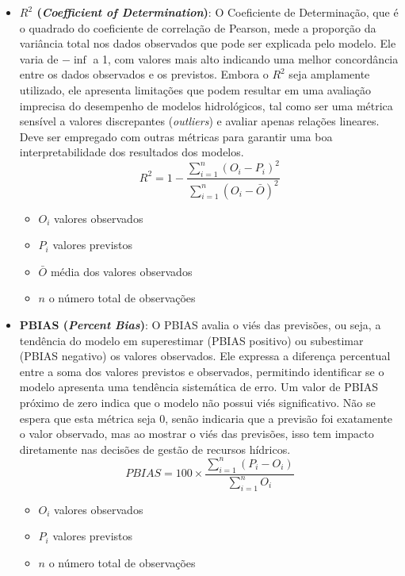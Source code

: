 \begin{itemize}
	\item \textbf{$R^2$ (\textit{Coefficient of Determination})}: O Coeficiente de Determinação, que é o quadrado do coeficiente de correlação de Pearson, mede a proporção da variância total nos dados observados que pode ser explicada pelo modelo. Ele varia de $-\inf$ a 1, com valores mais alto indicando uma melhor concordância entre os dados observados e os previstos. Embora o $R^2$ seja amplamente utilizado, ele apresenta limitações que podem resultar em uma avaliação imprecisa do desempenho de modelos hidrológicos, tal como ser uma métrica sensível a valores discrepantes (\textit{outliers}) e avaliar apenas relações lineares. Deve ser empregado com outras métricas para garantir uma boa interpretabilidade dos resultados dos modelos.\cite{legates1999goodness}
	\begin{equation}
		R^2 = 1 - \frac{\sum_{i=1}^{n} (O_i - {P_i})^2}{\sum_{i=1}^{n} (O_i - \bar{O})^2}
	\end{equation}
	\begin{itemize}
		\item $O_i$ valores observados
		\item $P_i$ valores previstos
		\item $\bar{O}$ média dos valores observados
		\item $n$ o número total de observações
	\end{itemize}
	
	\item \textbf{PBIAS (\textit{Percent Bias})}: O PBIAS avalia o viés das previsões, ou seja, a tendência do modelo em superestimar (PBIAS positivo) ou subestimar (PBIAS negativo) os valores observados. Ele expressa a diferença percentual entre a soma dos valores previstos e observados, permitindo identificar se o modelo apresenta uma tendência sistemática de erro. Um valor de PBIAS próximo de zero indica que o modelo não possui viés significativo. Não se espera que esta métrica seja 0, senão indicaria que a previsão foi exatamente o valor observado, mas ao mostrar o viés das previsões, isso tem impacto diretamente nas decisões de gestão de recursos hídricos.\cite{rayyan-33388455}
	\begin{equation}
		PBIAS = 100 \times \frac{\sum_{i=1}^{n} (P_i - O_i)}{\sum_{i=1}^{n} O_i}
	\end{equation}
	\begin{itemize}
		\item $O_i$ valores observados
		\item $P_i$ valores previstos
		\item $n$ o número total de observações
	\end{itemize}
	

\end{itemize}
